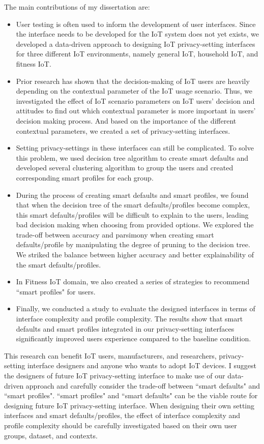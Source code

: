 The main contributions of my dissertation are:
\begin{itemize}
	\item User testing is often used to inform the development of user interfaces. Since the interface needs to be developed for the IoT system does not yet exists, we developed a data-driven approach to designing IoT privacy-setting interfaces for three different IoT environments, namely general IoT, household IoT, and fitness IoT.
	\item Prior research has shown that the decision-making of IoT users are heavily depending on the contextual parameter of the IoT usage scenario. Thus, we investigated the effect of IoT scenario parameters on IoT users’ decision and attitudes to find out which contextual parameter is more important in users’ decision making process. And based on the importance of the different contextual parameters, we created a set of privacy-setting interfaces.
	\item Setting privacy-settings in these interfaces can still be complicated. To solve this problem, we used decision tree algorithm to create smart defaults and developed several clustering algorithm to group the users and created corresponding smart profiles for each group.
	\item During the process of creating smart defaults and smart profiles, we found that when the decision tree of the smart defaults/profiles become complex, this smart defaults/profiles will be difficult to explain to the users, leading bad decision making when choosing from provided options. We explored the trade-off between accuracy and parsimony when creating smart defaults/profile by manipulating the degree of pruning to the decision tree. We striked the balance between higher accuracy  and better explainability of the smart defaults/profiles.
	\item In Fitness IoT domain, we also created a series of strategies to recommend ``smart profiles" for users.
	\item Finally, we conducted a study to evaluate the designed interfaces in terms of interface complexity and profile complexity. The results show that smart defaults and smart profiles integrated in our privacy-setting interfaces significantly improved users experience compared to the baseline condition.
\end{itemize}

This research can benefit IoT users, manufacturers, and researchers, privacy-setting interface designers and anyone who wants to adopt IoT devices.
I suggest the designers of future IoT privacy-setting interface to make use of our data-driven approach and carefully consider the trade-off between ``smart defaults" and ``smart profiles". ``smart profiles" and ``smart defaults" can be the viable route for designing future IoT privacy-setting interface. When designing their own setting interfaces and smart defaults/profiles, the effect of interface complexity and profile complexity should be carefully investigated based on their own user groups, dataset, and contexts.


